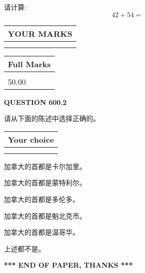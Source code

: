 \documentclass{ctexart}
\begin{document}
  
 
请计算:
\begin{equation}
42 +  %
54 = \nonumber
\end{equation}
 

 

 
  
\vspace{0.2in}
  
\noindent\begin{tabular}{|l|}
\hline
 YOUR MARKS  \\
\hline
 \\ 
 \\ 
\hline
\end{tabular}
\hspace{0.05in} \begin{tabular}{|l|}
\hline
 Full Marks  \\
\hline
 \\ 
50.00 \\
\hline
\end{tabular}
{\textbf{\Large{QUESTION
600.2 
}}}
  
  
请从下面的陈述中选择正确的。
  
  
\noindent\hspace{3.0in} \begin{tabular}{|l|}
\hline
Your choice \\
\hline
 \\ 
 \\ 
\hline
\end{tabular}
  
  
 
 
加拿大的首都是卡尔加里。
 
 
加拿大的首都是蒙特利尔。
 
 
加拿大的首都是多伦多。
 
 
加拿大的首都是魁北克市。
 
 
加拿大的首都是温哥华。
 
 
 上述都不是。
 
 
   
   
 \vspace{0.2in}
 
   
   
   
   
\vspace{1.0in} 
{\textbf{\large{ *** END OF PAPER, THANKS *** }}} 
   
\end{document}
